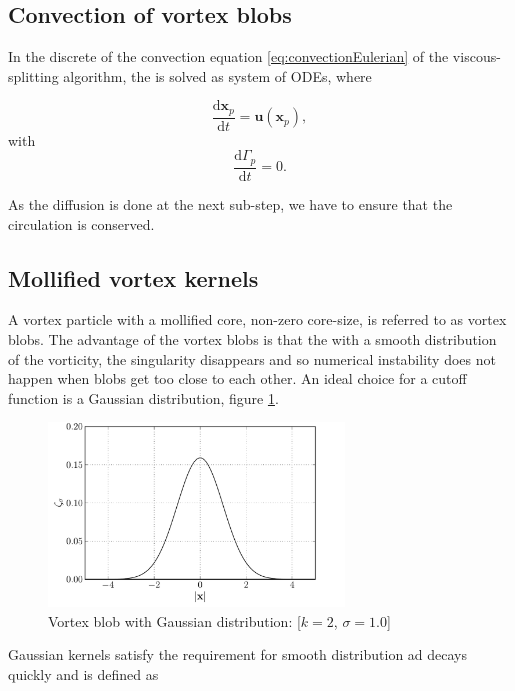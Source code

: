 \subsection{Convection of vortex blobs}

In the discrete of the convection equation \ref{eq:convectionEulerian} of the viscous-splitting algorithm, the is solved as system of ODEs, where

	\begin{equation}
	\frac{\mathrm{d}\mathbf{x}_p}{\mathrm{d}t} = \mathbf{u}\left(\mathbf{x}_p\right),
	\end{equation}
with
	\begin{equation}
	\frac{\mathrm{d}\Gamma_p}{\mathrm{d}t} = 0.
	\end{equation}

As the diffusion is done at the next sub-step, we have to ensure that the circulation is conserved.


\subsection{Mollified vortex kernels}

A vortex particle with a mollified core, non-zero core-size, is referred to as vortex blobs. The advantage of the vortex blobs is that the with a smooth distribution of the vorticity, the singularity disappears and so numerical instability does not happen when blobs get too close to each other. An ideal choice for a cutoff function is a Gaussian distribution, figure \ref{fig:gaussianDistribution}.

	\begin{figure}[t]
	\centering
	\includegraphics[width=0.7\textwidth]{figures/lagrangian/gaussianKernel.pdf}
	\caption{Vortex blob with Gaussian distribution: [$k=2$, $\sigma=1.0$]}
	\label{fig:gaussianDistribution}
	\end{figure}

Gaussian kernels satisfy the requirement for smooth distribution ad decays quickly and is defined as
	
